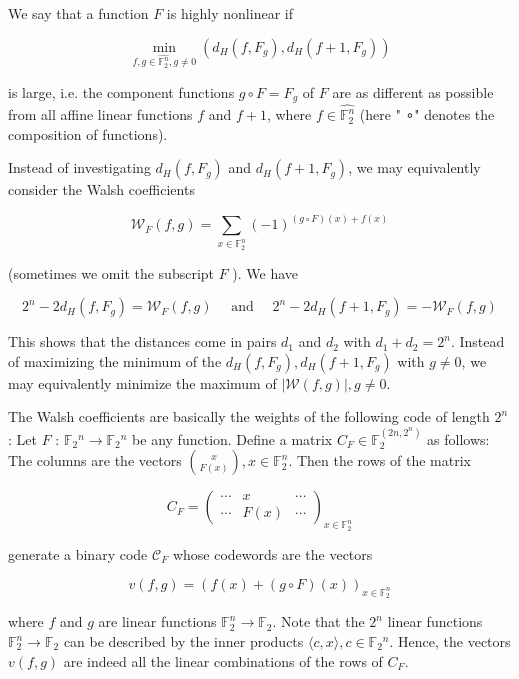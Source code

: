 \documentclass[10pt]{article}
\begin{document}
We say that a function $F$ is highly nonlinear if


\begin{equation*}
\min _{f, g \in \widehat{\mathbb{F}_{2}^{n}}, g \neq 0}\left(d_{H}\left(f, F_{g}\right), d_{H}\left(f+1, F_{g}\right)\right) \tag{1}
\end{equation*}


is large, i.e. the component functions $g \circ F=F_{g}$ of $F$ are as different as possible from all affine linear functions $f$ and $f+1$, where $f \in \widehat{\mathbb{F}_{2}^{n}}$ (here " ∘" denotes the composition of functions).

Instead of investigating $d_{H}\left(f, F_{g}\right)$ and $d_{H}\left(f+1, F_{g}\right)$, we may equivalently consider the Walsh coefficients

$$
\mathcal{W}_{F}(f, g)=\sum_{x \in \mathbb{F}_{2}^{n}}(-1)^{(g \circ F)(x)+f(x)}
$$

(sometimes we omit the subscript $F$ ). We have

$$
2^{n}-2 d_{H}\left(f, F_{g}\right)=\mathcal{W}_{F}(f, g) \quad \text { and } \quad 2^{n}-2 d_{H}\left(f+1, F_{g}\right)=-\mathcal{W}_{F}(f, g)
$$

This shows that the distances come in pairs $d_{1}$ and $d_{2}$ with $d_{1}+d_{2}=2^{n}$. Instead of maximizing the minimum of the $d_{H}\left(f, F_{g}\right), d_{H}\left(f+1, F_{g}\right)$ with $g \neq 0$, we may equivalently minimize the maximum of $|\mathcal{W}(f, g)|, g \neq 0$.

The Walsh coefficients are basically the weights of the following code of length $2^{n}$ : Let $F$ : $\mathbb{F}_{2}{ }^{n} \rightarrow \mathbb{F}_{2}{ }^{n}$ be any function. Define a matrix $C_{F} \in \mathbb{F}_{2}^{\left(2 n, 2^{n}\right)}$ as follows: The columns are the vectors $\binom{x}{F(x)}, x \in \mathbb{F}_{2}^{n}$. Then the rows of the matrix

$$
C_{F}=\left(\begin{array}{ccc}
\cdots & x & \cdots \\
\cdots & F(x) & \cdots
\end{array}\right)_{x \in \mathbb{F}_{2}^{n}}
$$

generate a binary code $\mathcal{C}_{F}$ whose codewords are the vectors

$$
v(f, g)=(f(x)+(g \circ F)(x))_{x \in \mathbb{F}_{2}^{n}}
$$

where $f$ and $g$ are linear functions $\mathbb{F}_{2}^{n} \rightarrow \mathbb{F}_{2}$. Note that the $2^{n}$ linear functions $\mathbb{F}_{2}^{n} \rightarrow \mathbb{F}_{2}$ can be described by the inner products $\langle c, x\rangle, c \in \mathbb{F}_{2}{ }^{n}$. Hence, the vectors $v(f, g)$ are indeed all the linear combinations of the rows of $C_{F}$.
\end{document}
